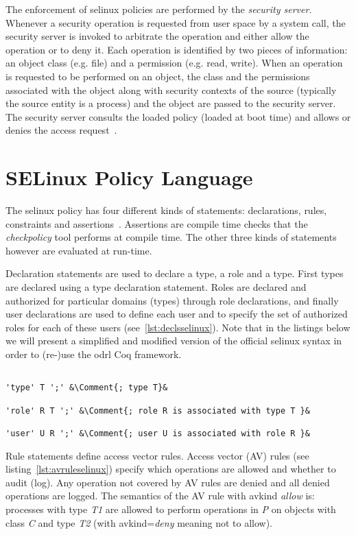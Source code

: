 The enforcement of \ac{selinux} policies are performed by the \emph{security server}. Whenever a security operation is requested from user space by a system call, the security server is invoked to arbitrate the operation and either allow the operation or to deny it. Each operation is identified by two pieces of information: an object class (e.g. file) and a permission (e.g. read, write). When an operation is requested to be performed on an object, the class and the permissions associated with the object along with security contexts of the source (typically the source entity is a process) and the object are passed to the security server. The security server consults the loaded policy (loaded at boot time) and allows or denies the access request~\cite{Sarna}.

\section{SELinux Policy Language}

The \ac{selinux} policy has four different kinds of statements: declarations, rules, constraints and assertions~\cite{ArcherLP03}. Assertions are compile time checks that the \emph{checkpolicy} tool performs at compile time. The other three kinds of statements however are evaluated at run-time. 

Declaration statements are used to declare a type, a role and a type. First types are declared using a type declaration statement. Roles are declared and authorized for particular domains (types) through role declarations, and finally user declarations are used to define each user and to specify the set of authorized roles for each of these users (see~\ref{lst:declsselinux}). Note that in the listings below we will present a simplified and modified version of the official \ac{selinux} syntax in order to (re-)use the \ac{odrl} Coq framework.

\lstset{language=selinux}
\begin{lstlisting}[frame=single, caption={Declarations},label={lst:declsselinux}]

'type' T ';' &\Comment{; type T}&

'role' R T ';' &\Comment{; role R is associated with type T }&

'user' U R ';' &\Comment{; user U is associated with role R }&

\end{lstlisting}

Rule statements define access vector rules. Access vector (AV) rules (see listing~\ref{lst:avruleselinux}) specify which operations are allowed and whether to audit (log). Any operation not covered by AV rules are denied and all denied operations are logged. The semantics of the AV rule with avkind \emph{allow} is: processes with type \emph{T1} are allowed to perform operations in \emph{P} on objects with class \emph{C} and type \emph{T2} (with avkind=\emph{deny} meaning not to allow). 

